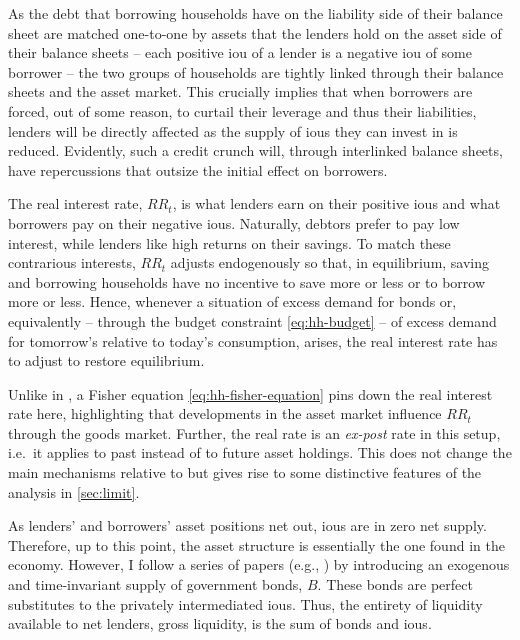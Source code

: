 \documentclass[a4paper,12pt]{article} %
\numberwithin{equation}{section} %
\numberwithin{figure}{section}
\numberwithin{table}{section}
\begin{document}
As the debt that borrowing households have on the liability side of their balance sheet are matched one-to-one by assets that the lenders hold on the asset side of their balance sheets -- each positive \Gls{iou} of a lender is a negative \Gls{iou} of some borrower -- the two groups of households are tightly linked through their balance sheets and the asset market. This crucially implies that when borrowers are forced, out of some reason, to curtail their leverage and thus their liabilities, lenders will be directly affected as the supply of \Gls{iou}s they can invest in is reduced. Evidently, such a credit crunch will, through interlinked balance sheets, have repercussions that outsize the initial effect on borrowers. %

The real interest rate, $RR_t$, is what lenders earn on their positive \Gls{iou}s and what borrowers pay on their negative \Gls{iou}s. Naturally, debtors prefer to pay low interest, while lenders like high returns on their savings. To match these contrarious interests, $RR_t$ adjusts endogenously so that, in equilibrium, saving and borrowing households have no incentive to save more or less or to borrow more or less. Hence, whenever a situation of excess demand for bonds or, equivalently -- through the budget constraint \eqref{eq:hh-budget} -- of excess demand for tomorrow's relative to today's consumption, arises, the real interest rate has to adjust to restore equilibrium. %

Unlike in \textcite{gl2017}, a Fisher equation \eqref{eq:hh-fisher-equation} pins down the real interest rate here, highlighting that developments in the asset market influence $RR_t$ through the goods market. Further, the real rate is an \textit{ex-post} rate in this setup, i.e.~it applies to past instead of to future asset holdings. This does not change the main mechanisms relative to \textcite{gl2017} but gives rise to some distinctive features of the analysis in \ref{sec:limit}.

As lenders' and borrowers' asset positions net out, \Gls{iou}s are in zero net supply. Therefore, up to this point, the asset structure is essentially the one found in the \textcite{huggett1993} economy. However, I follow a series of papers (e.g.\cite{gl2017}, \cite{bayer2023}) by introducing an exogenous and time-invariant supply of government bonds, $B$. These bonds are perfect substitutes to the privately intermediated \Gls{iou}s. Thus, the entirety of liquidity available to net lenders, gross liquidity, is the sum of bonds and \Gls{iou}s.
\end{document}
